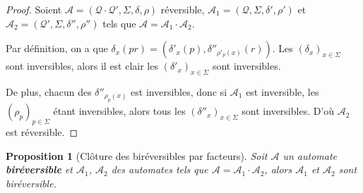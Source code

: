 \documentclass{article}
\newtheorem{prop}{Proposition}
\begin{document}
\begin{proof}
  Soient $\mathcal{A}=\left(\mathcal{Q\cdot Q'}, \Sigma, \delta, \rho\right)$ réversible, $\mathcal{A}_1=\left(\mathcal{Q}, \Sigma, \delta', \rho'\right)$ et $\mathcal{A}_2=\left(\mathcal{Q'}, \Sigma, \delta'', \rho''\right)$ tels que $\mathcal{A} = \mathcal{A}_1\cdot\mathcal{A}_2$.

  Par définition, on a que $\delta_x(pr) = (\delta'_x(p), \delta''_{\rho'_p(x)}(r))$. Les $(\delta_x)_{x\in\Sigma}$ sont inversibles, alors il est clair les $(\delta'_x)_{x\in\Sigma}$ sont inversibles.

  De plus, chacun des $\delta''_{\rho_p(x)}$ est inversibles, donc si $\mathcal{A}_1$ est inversible, les $(\rho_p)_{p\in\Sigma}$ étant inversibles, alors tous les $(\delta''_x)_{x\in\Sigma}$ sont inversibles. D'où $\mathcal{A}_2$ est réversible.

\end{proof}

\begin{prop}[Clôture des biréversibles par facteurs]
  Soit $\mathcal{A}$ un automate \textbf{biréversible} et $\mathcal{A}_1$, $\mathcal{A}_2$ des automates tels que $\mathcal{A}=\mathcal{A}_1\cdot\mathcal{A}_2$, alors $\mathcal{A}_1$ et $\mathcal{A}_2$ sont biréversible.
\end{prop}
\end{document}
